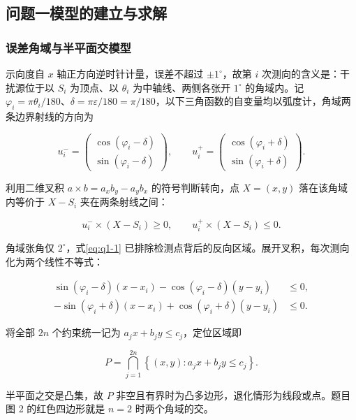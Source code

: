 \subsection{问题一模型的建立与求解}\label{sec:q1}
\subsubsection{误差角域与半平面交模型}\label{sec:q1-1}
示向度自 $x$ 轴正方向逆时针计量，误差不超过 $\pm 1^\circ$，故第 $i$ 次测向的含义是：干扰源位于以 $S_i$ 为顶点、以 $\theta_i$ 为中轴线、两侧各张开 $1^\circ$ 的角域内。记 $\varphi_i=\pi\theta_i/180$、$\delta=\pi\varepsilon/180=\pi/180$，以下三角函数的自变量均以弧度计，角域两条边界射线的方向为

\[
u_i^-=\begin{pmatrix}\cos(\varphi_i-\delta)\\ \sin(\varphi_i-\delta)\end{pmatrix},\qquad
u_i^+=\begin{pmatrix}\cos(\varphi_i+\delta)\\ \sin(\varphi_i+\delta)\end{pmatrix}.
\]

利用二维叉积 $a\times b=a_xb_y-a_yb_x$ 的符号判断转向，点 $X=(x,y)$ 落在该角域内等价于 $X-S_i$ 夹在两条射线之间：

\begin{equation}\label{eq:q1-1}
u_i^-\times(X-S_i)\ge 0,\qquad u_i^+\times(X-S_i)\le 0.
\end{equation}

角域张角仅 $2^\circ$，式\eqref{eq:q1-1} 已排除检测点背后的反向区域。展开叉积，每次测向化为两个线性不等式：

\begin{equation}\label{eq:q1-2}
\begin{aligned}
\sin(\varphi_i-\delta)(x-x_i)-\cos(\varphi_i-\delta)(y-y_i)&\le 0,\\
-\sin(\varphi_i+\delta)(x-x_i)+\cos(\varphi_i+\delta)(y-y_i)&\le 0.
\end{aligned}
\end{equation}

将全部 $2n$ 个约束统一记为 $a_jx+b_jy\le c_j$，定位区域即

\begin{equation}\label{eq:q1-3}
P=\bigcap_{j=1}^{2n}\left\{(x,y):a_jx+b_jy\le c_j\right\}.
\end{equation}

半平面之交是凸集，故 $P$ 非空且有界时为凸多边形，退化情形为线段或点。题目图 2 的红色四边形就是 $n=2$ 时两个角域的交。

